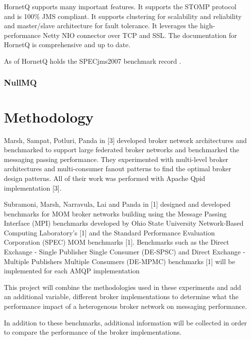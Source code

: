 \documentclass{thesis}
\begin{document}
HornetQ supports many important features.  It supports the STOMP  protocol and is 100\% JMS compliant.  It supports clustering for scalability and reliability and master/slave architecture for fault tolerance.  It leverages the high-performance Netty NIO connector over TCP and SSL.  The documentation for HornetQ is comprehensive and up to date.  

As of  HornetQ holds the SPECjms2007 benchmark record .  



\subsection{NullMQ}

\chapter{Methodology}
Marsh, Sampat, Potluri, Panda in [3] developed broker network architectures and benchmarked to support large federated broker networks and benchmarked the messaging passing performance.  They experimented with multi-level broker architectures and multi-consumer fanout patterns to find the optimal broker design patterns.  All of their work was performed with Apache Qpid implementation [3].  

Subramoni, Marsh, Narravula, Lai and Panda in [1] designed and developed benchmarks for MOM broker networks building using the Message Passing Interface (MPI) benchmarks developed by Ohio State University Network-Based Computing Laboratory’s [1] and the Standard Performance Evaluation Corporation (SPEC) MOM benchmarks  [1].  Benchmarks such as the Direct Exchange - Single Publisher Single Consumer (DE-SPSC) and Direct Exchange - Multiple Publishers Multiple Consumers (DE-MPMC) benchmarks [1] will be implemented for each AMQP implementation 

This project will combine the methodologies used in these experiments and add an additional variable, different broker implementations to determine what the performance impact of a heterogenous broker network on messaging performance.

In addition to these benchmarks, additional information will be collected in order to compare the performance of the broker implementations.
\end{document}
